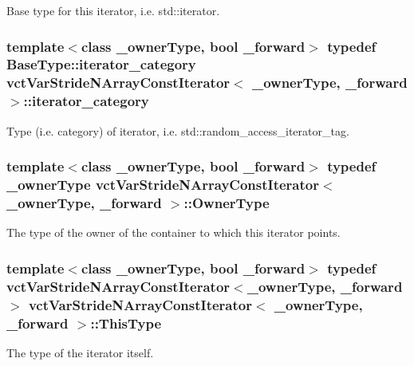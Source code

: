 Base type for this iterator, i.\-e. std\-::iterator. \hypertarget{classvct_var_stride_n_array_const_iterator_a09142c21a89b54a40ad29eb7972c6f78}{
\subsubsection[{iterator\-\_\-category}]{\setlength{\rightskip}{0pt plus 5cm}template$<$class \-\_\-owner\-Type, bool \-\_\-forward$>$ typedef Base\-Type\-::iterator\-\_\-category {\bf vct\-Var\-Stride\-N\-Array\-Const\-Iterator}$<$ \-\_\-owner\-Type, \-\_\-forward $>$\-::{\bf iterator\-\_\-category}}}\label{classvct_var_stride_n_array_const_iterator_a09142c21a89b54a40ad29eb7972c6f78}
Type (i.\-e. category) of iterator, i.\-e. std\-::random\-\_\-access\-\_\-iterator\-\_\-tag. \hypertarget{classvct_var_stride_n_array_const_iterator_ac75d53a8defeee467ba9ebe2962e29ac}{
\subsubsection[{Owner\-Type}]{\setlength{\rightskip}{0pt plus 5cm}template$<$class \-\_\-owner\-Type, bool \-\_\-forward$>$ typedef \-\_\-owner\-Type {\bf vct\-Var\-Stride\-N\-Array\-Const\-Iterator}$<$ \-\_\-owner\-Type, \-\_\-forward $>$\-::{\bf Owner\-Type}}}\label{classvct_var_stride_n_array_const_iterator_ac75d53a8defeee467ba9ebe2962e29ac}
The type of the owner of the container to which this iterator points. \hypertarget{classvct_var_stride_n_array_const_iterator_ac729d2af265785aad6fdd43a70fbffdb}{
\subsubsection[{This\-Type}]{\setlength{\rightskip}{0pt plus 5cm}template$<$class \-\_\-owner\-Type, bool \-\_\-forward$>$ typedef {\bf vct\-Var\-Stride\-N\-Array\-Const\-Iterator}$<$\-\_\-owner\-Type, \-\_\-forward$>$ {\bf vct\-Var\-Stride\-N\-Array\-Const\-Iterator}$<$ \-\_\-owner\-Type, \-\_\-forward $>$\-::{\bf This\-Type}}}\label{classvct_var_stride_n_array_const_iterator_ac729d2af265785aad6fdd43a70fbffdb}
The type of the iterator itself. 


